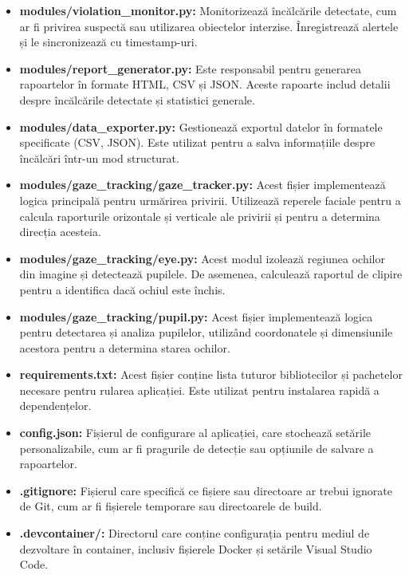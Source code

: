 \documentclass[12pt,a4paper]{article}
\begin{document}
\begin{itemize}
    \item \textbf{modules/violation\_monitor.py:} Monitorizează încălcările detectate, cum ar fi privirea suspectă sau utilizarea obiectelor interzise. Înregistrează alertele și le sincronizează cu timestamp-uri.

    \item \textbf{modules/report\_generator.py:} Este responsabil pentru generarea rapoartelor în formate HTML, CSV și JSON. Aceste rapoarte includ detalii despre încălcările detectate și statistici generale.

    \item \textbf{modules/data\_exporter.py:} Gestionează exportul datelor în formatele specificate (CSV, JSON). Este utilizat pentru a salva informațiile despre încălcări într-un mod structurat.
    
    \item \textbf{modules/gaze\_tracking/gaze\_tracker.py:} Acest fișier implementează logica principală pentru urmărirea privirii. Utilizează reperele faciale pentru a calcula raporturile orizontale și verticale ale privirii și pentru a determina direcția acesteia.

    \item \textbf{modules/gaze\_tracking/eye.py:} Acest modul izolează regiunea ochilor din imagine și detectează pupilele. De asemenea, calculează raportul de clipire pentru a identifica dacă ochiul este închis.

    \item \textbf{modules/gaze\_tracking/pupil.py:} Acest fișier implementează logica pentru detectarea și analiza pupilelor, utilizând coordonatele și dimensiunile acestora pentru a determina starea ochilor.

    \item \textbf{requirements.txt:} Acest fișier conține lista tuturor bibliotecilor și pachetelor necesare pentru rularea aplicației. Este utilizat pentru instalarea rapidă a dependențelor.

    \item \textbf{config.json:} Fișierul de configurare al aplicației, care stochează setările personalizabile, cum ar fi pragurile de detecție sau opțiunile de salvare a rapoartelor.

    \item \textbf{.gitignore:} Fișierul care specifică ce fișiere sau directoare ar trebui ignorate de Git, cum ar fi fișierele temporare sau directoarele de build.

    \item \textbf{.devcontainer/:} Directorul care conține configurația pentru mediul de dezvoltare în container, inclusiv fișierele Docker și setările Visual Studio Code.
\end{itemize}
\end{document}
